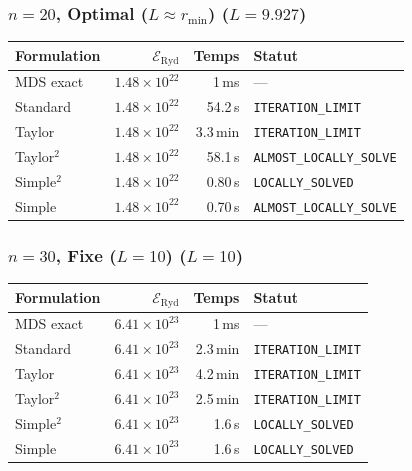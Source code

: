 \subsubsection{$n=20$, Optimal ($L{\approx}r_{\min}$) ($L=9.927$)}
\begin{longtable}{@{}lrrl@{}}
  \toprule
  Formulation & $\mathcal{E}_{\mathrm{Ryd}}$ & Temps & Statut \\
  \midrule
  \endhead
  MDS exact & $1.48\times10^{22}$ & 1\,ms & --- \\
  Standard & $1.48\times10^{22}$ & 54.2\,s & \texttt{ITERATION\_LIMIT} \\
  Taylor & $1.48\times10^{22}$ & 3.3\,min & \texttt{ITERATION\_LIMIT} \\
  Taylor$^2$ & $1.48\times10^{22}$ & 58.1\,s & \texttt{ALMOST\_LOCALLY\_SOLVE} \\
  Simple$^2$ & $1.48\times10^{22}$ & 0.80\,s & \texttt{LOCALLY\_SOLVED} \\
  Simple & $1.48\times10^{22}$ & 0.70\,s & \texttt{ALMOST\_LOCALLY\_SOLVE} \\
  \bottomrule
\end{longtable}

\subsubsection{$n=30$, Fixe ($L{=}10$) ($L=10$)}
\begin{longtable}{@{}lrrl@{}}
  \toprule
  Formulation & $\mathcal{E}_{\mathrm{Ryd}}$ & Temps & Statut \\
  \midrule
  \endhead
  MDS exact & $6.41\times10^{23}$ & 1\,ms & --- \\
  Standard & $6.41\times10^{23}$ & 2.3\,min & \texttt{ITERATION\_LIMIT} \\
  Taylor & $6.41\times10^{23}$ & 4.2\,min & \texttt{ITERATION\_LIMIT} \\
  Taylor$^2$ & $6.41\times10^{23}$ & 2.5\,min & \texttt{ITERATION\_LIMIT} \\
  Simple$^2$ & $6.41\times10^{23}$ & 1.6\,s & \texttt{LOCALLY\_SOLVED} \\
  Simple & $6.41\times10^{23}$ & 1.6\,s & \texttt{LOCALLY\_SOLVED} \\
  \bottomrule
\end{longtable}

